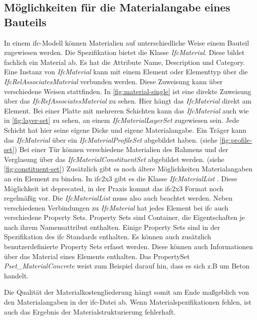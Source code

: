 \subsection{Möglichkeiten für die Materialangabe eines Bauteils}
\label{c:basics:ifc:buildingmaterial}
In einem \ac{ifc}-Modell können Materialien auf unterschiedliche Weise einem Bauteil zugewiesen werden. Die Spezifikation bietet die Klasse \textit{IfcMaterial}. Diese bildet fachlich ein Material ab. Es hat die Attribute Name, Description und Category.\citep[vgl.][]{ifc_material} Eine Instanz von \textit{IfcMaterial} kann mit einem Element oder Elementtyp über die \textit{IfcRelAssociatesMaterial} verbunden werden. Diese Zuweisung kann über verschiedene Weisen stattfinden. In \autoref{fig:material-single} ist eine direkte Zuweisung über das \textit{IfcRefAssociatesMaterial} zu sehen. Hier hängt das \textit{IfcMaterial} direkt am Element. 
Bei einer Platte mit mehreren Schichten kann das \textit{IfcMaterial} auch wie in \autoref{fig:layer-set} zu sehen, an einem \textit{IfcMaterialLayerSet} zugewiesen sein. Jede Schicht hat hier seine eigene Dicke und eigene Materialangabe. Ein Träger kann das \textit{IfcMaterial} über ein \textit{IfcMaterialProfileSet} abgebildet haben. (siehe \autoref{fig:profile-set}) Bei einer Tür können verschiedene Materialien des Rahmens und der Verglasung über das \textit{IfcMaterialConstituentSet} abgebildet werden. (siehe \autoref{fig:constituent-set}) \citep[vgl.][]{ifc_material_association} Zusätzlich gibt es noch ältere Möglichkeiten Materialangaben an ein Element zu binden. In \ac{ifc2x3} gibt es die Klasse \textit{IfcMaterialList} \citep[vgl.][]{Thomas2007_MaterialList}. Diese Möglichkeit ist deprecated, in der Praxis kommt das \ac{ifc2x3} Format noch regelmäßig vor. Die \textit{IfcMaterialList} muss also auch beachtet werden. Neben verschiedenen Verbindungen zu \textit{IfcMaterial} hat jedes Element bei \ac{ifc} auch verschiedene Property Sets. Property Sets sind Container, die Eigentschaften je nach ihrem Namensattribut enthalten. Einige Property Sets sind in der Spezifikation des \ac{ifc} Standards enthalten. Es können auch zusätzlich benutzerdefinierte Property Sets erfasst werden. Diese können auch Informationen über das Material eines Elements enthalten. \citep[vgl.][]{ifc_property_set} Das PropertySet \textit{Pset\_MaterialConcrete} weist zum Beispiel darauf hin, dass es sich z.B um Beton handelt.

Die Qualität der Materialkostengliederung hängt somit am Ende maßgeblich von den Materialangaben in der \ac{ifc}-Datei ab. Wenn Materialspezifikationen fehlen, ist auch das Ergebnis der Materialstrukturierung fehlerhaft.

